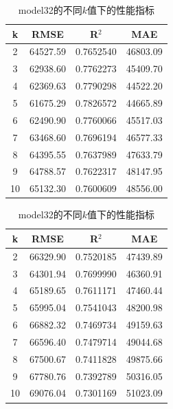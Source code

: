 \documentclass[a4paper,12pt,onecolumn,oneside]{article}
\begin{document}
	\begin{table}[h]
	\centering
	\begin{subtable}{0.45\textwidth}
		\centering
		\begin{tabular}{cccc}
			\toprule
			k & RMSE & R$^2$ & MAE \\
			\midrule
		2 & 64527.59 & 0.7652540 & 46803.09\\
		3 & 62938.60 & 0.7762273 & 45409.70\\
		4 & 62369.63 & 0.7790298 & 44522.20\\
\rowcolor{gray!25}5 & 61675.29 & 0.7826572 & 44665.89\\
		6 & 62490.90 & 0.7760066 & 45517.03\\
		7 & 63468.60 & 0.7696194 & 46577.33\\
		8 & 64395.55 & 0.7637989 & 47633.79\\
		9 & 64788.57 & 0.7622317 & 48147.95\\
		10 & 65132.30 & 0.7600609 & 48556.00\\
			\bottomrule
		\end{tabular}
		\caption{model31的不同$k$值下的性能指标}
		\label{tbl:model31}
	\end{subtable}
	\hfill
	\begin{subtable}{0.45\textwidth}
		\centering
		\begin{tabular}{cccc}
			\toprule
			k & RMSE & R$^2$ & MAE \\
			\midrule
			2 & 66329.90 & 0.7520185 & 47439.89\\
\rowcolor{gray!25}3 & 64301.94 & 0.7699990 & 46360.91\\
			4 & 65189.65 & 0.7611171 & 47460.44\\
			5 & 65995.04 & 0.7541043 & 48200.98\\
			6 & 66882.32 & 0.7469734 & 49159.63\\
			7 & 66596.40 & 0.7479714 & 49044.68\\
			8 & 67500.67 & 0.7411828 & 49875.66\\
			9 & 67780.76 & 0.7392789 & 50316.05\\
			10 & 69076.04 & 0.7301169 & 51023.09\\
			\bottomrule
		\end{tabular}
		\caption{model32的不同$k$值下的性能指标}
		\label{tbl:model32}
	\end{subtable}
	\end{table}
\end{document}
